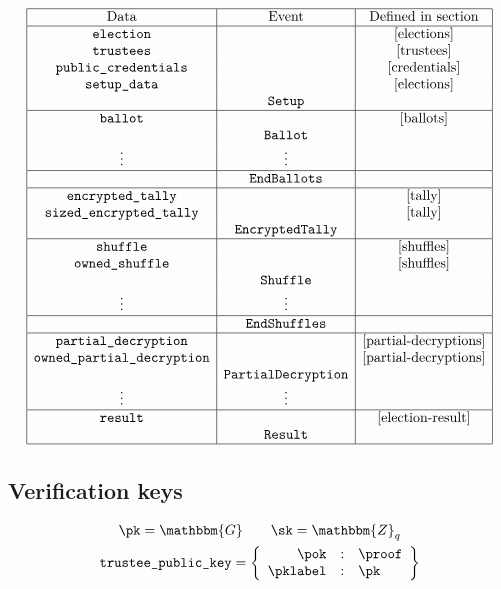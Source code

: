 \documentclass[a4paper]{article}
\newcommand{\G}{\mathbbm{G}}
\newcommand{\Z}{\mathbbm{Z}}
\newcommand{\tpk}{\texttt{trustee\_public\_key}}
\begin{document}
\begin{gather*}
\begin{array}{|c|c|c|}
  \hline
  \text{Data}&\text{Event}&\text{Defined in section}\\
  \hline
  \texttt{election}&&\ref{elections}\\
  \texttt{trustees}&&\ref{trustees}\\
  \texttt{public\_credentials}&&\ref{credentials}\\
  \texttt{setup\_data}&&\ref{elections}\\
  &\texttt{Setup}& \\
  \hline
  \texttt{ballot}&&\ref{ballots}\\
  &\texttt{Ballot}&\\
  \vdots&\vdots&\\
  \hline
  &\texttt{EndBallots}&\\
  \hline
  \texttt{encrypted\_tally}&&\ref{tally}\\
  \texttt{sized\_encrypted\_tally}&&\ref{tally}\\
  &\texttt{EncryptedTally}&\\
  \hline
  \texttt{shuffle}&&\ref{shuffles}\\
  \texttt{owned\_shuffle}&&\ref{shuffles}\\
  &\texttt{Shuffle}&\\
  \vdots&\vdots&\\
  \hline
  &\texttt{EndShuffles}&\\
  \hline
  \texttt{partial\_decryption}&&\ref{partial-decryptions}\\
  \texttt{owned\_partial\_decryption}&&\ref{partial-decryptions}\\
  &\texttt{PartialDecryption}&\\
  \vdots&\vdots&\\
  \hline
  \texttt{result}&&\ref{election-result}\\
  &\texttt{Result}&\\
  \hline
\end{array}
\end{gather*}

\subsection{Verification keys}
\label{trustee-keys}

\begin{gather*}
  \pk=\G\qquad\sk=\Z_q\\
  \tpk=\left\{
    \begin{array}{rcl}
      \pok&:&\proof\\
      \pklabel&:&\pk
    \end{array}
  \right\}
\end{gather*}
\end{document}

